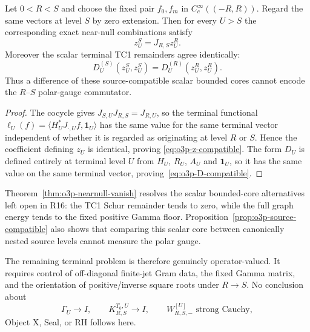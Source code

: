 \begin{proposition}
\label{prop:o3p-source-compatible}
Let $0<R<S$ and choose the fixed pair $f_0,f_m$ in $C_c^\infty((-R,R))$.  Regard the
same vectors at level $S$ by zero extension.  Then for every $U>S$ the corresponding
exact near-null combinations satisfy
\[
 \boxed{z_U^S=J_{R,S}z_U^R.}
\tag{O3P.15}\label{eq:o3p-z-compatible}
\]
Moreover the scalar terminal TC1 remainders agree identically:
\[
 \boxed{
 D_U^{(S)}(z_U^S,z_U^S)
 =D_U^{(R)}(z_U^R,z_U^R).
 }
\tag{O3P.16}\label{eq:o3p-D-compatible}
\]
Thus a difference of these source-compatible scalar bounded cores cannot encode the
$R$--$S$ polar-gauge commutator.
\end{proposition}

\begin{proof}
The cocycle gives $J_{S,U}J_{R,S}=J_{R,U}$, so the terminal functional
$\ell_U(f)=\langle H_U^*J_{\cdot,U}f,\mathbf1_U\rangle$ has the same value for the same
terminal vector independent of whether it is regarded as originating at level $R$ or
$S$.  Hence the coefficient defining $z_U$ is identical, proving
\eqref{eq:o3p-z-compatible}.  The form $D_U$ is defined entirely at terminal level $U$
from $H_U$, $R_U$, $A_U$ and $\mathbf1_U$, so it has the same value on the same terminal
vector, proving~\eqref{eq:o3p-D-compatible}.
\end{proof}

\begin{remark}[R17 firewall]\label{rem:o3p-firewall}
Theorem~\ref{thm:o3p-nearnull-vanish} resolves the scalar bounded-core alternatives left
open in R16: the TC1 Schur remainder tends to zero, while the full graph energy tends to
the fixed positive Gamma floor.  Proposition~\ref{prop:o3p-source-compatible} also shows
that comparing this scalar core between canonically nested source levels cannot measure
the polar gauge.

The remaining terminal problem is therefore genuinely operator-valued.  It requires
control of off-diagonal finite-jet Gram data, the fixed Gamma matrix, and the orientation
of positive/inverse square roots under $R\to S$.  No conclusion about
\[
 \Gamma_U\to I,
 \qquad
 K_{R,S}^{T_0,U}\to I,
 \qquad
 W_{R,S,-}^{[U]}\text{ strong Cauchy},
\]
Object X, Seal, or RH follows here.
\end{remark}
